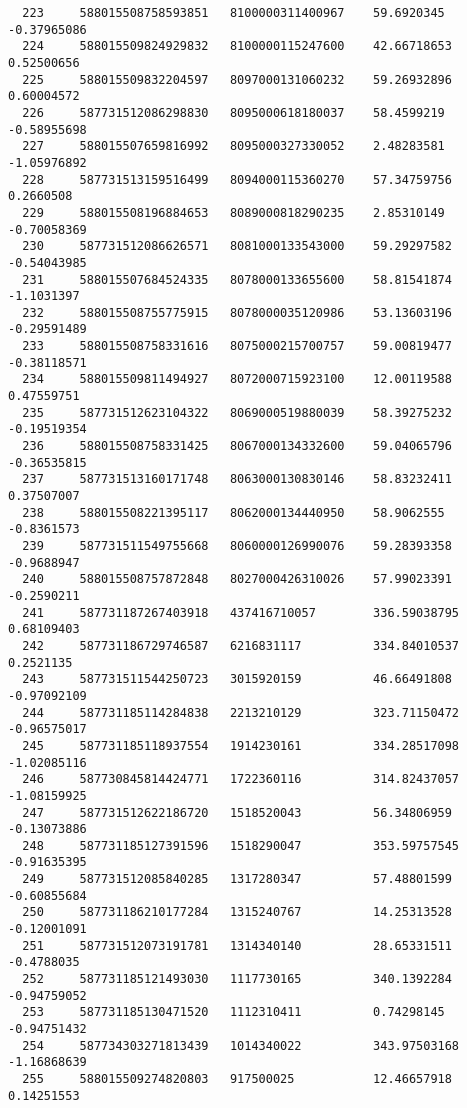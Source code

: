 \documentclass[a4paper,11pt]{article}
\begin{document}
\begin{verbatim}
  223     588015508758593851   8100000311400967    59.6920345     -0.37965086  
  224     588015509824929832   8100000115247600    42.66718653    0.52500656   
  225     588015509832204597   8097000131060232    59.26932896    0.60004572   
  226     587731512086298830   8095000618180037    58.4599219     -0.58955698  
  227     588015507659816992   8095000327330052    2.48283581     -1.05976892  
  228     587731513159516499   8094000115360270    57.34759756    0.2660508    
  229     588015508196884653   8089000818290235    2.85310149     -0.70058369  
  230     587731512086626571   8081000133543000    59.29297582    -0.54043985  
  231     588015507684524335   8078000133655600    58.81541874    -1.1031397   
  232     588015508755775915   8078000035120986    53.13603196    -0.29591489  
  233     588015508758331616   8075000215700757    59.00819477    -0.38118571  
  234     588015509811494927   8072000715923100    12.00119588    0.47559751   
  235     587731512623104322   8069000519880039    58.39275232    -0.19519354  
  236     588015508758331425   8067000134332600    59.04065796    -0.36535815  
  237     587731513160171748   8063000130830146    58.83232411    0.37507007   
  238     588015508221395117   8062000134440950    58.9062555     -0.8361573   
  239     587731511549755668   8060000126990076    59.28393358    -0.9688947   
  240     588015508757872848   8027000426310026    57.99023391    -0.2590211   
  241     587731187267403918   437416710057        336.59038795   0.68109403   
  242     587731186729746587   6216831117          334.84010537   0.2521135    
  243     587731511544250723   3015920159          46.66491808    -0.97092109  
  244     587731185114284838   2213210129          323.71150472   -0.96575017  
  245     587731185118937554   1914230161          334.28517098   -1.02085116  
  246     587730845814424771   1722360116          314.82437057   -1.08159925  
  247     587731512622186720   1518520043          56.34806959    -0.13073886  
  248     587731185127391596   1518290047          353.59757545   -0.91635395  
  249     587731512085840285   1317280347          57.48801599    -0.60855684  
  250     587731186210177284   1315240767          14.25313528    -0.12001091  
  251     587731512073191781   1314340140          28.65331511    -0.4788035   
  252     587731185121493030   1117730165          340.1392284    -0.94759052  
  253     587731185130471520   1112310411          0.74298145     -0.94751432  
  254     587734303271813439   1014340022          343.97503168   -1.16868639  
  255     588015509274820803   917500025           12.46657918    0.14251553   

\end{verbatim}
\end{document}
